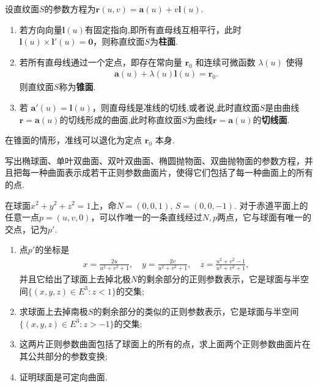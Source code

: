 \documentclass[../../main.tex]{subfiles}%
\begin{document}
\begin{definition}
设直纹面$S$的参数方程为$\bm{r}(u,v)=\bm{a}(u)+v\bm{l}(u)$.
\begin{enumerate}[(1)]
\item 若方向向量$\bm{l}(u)$有固定指向,即所有直母线互相平行，此时$\bm{l}(u)\times\bm{l}'(u)=\bm{0}$，则称直纹面$S$为\textbf{柱面}.

\item 若所有直母线通过一个定点，即存在常向量 $\bm{r}_0$ 和连续可微函数 $\lambda(u)$ 使得
\begin{align*}
\bm{a}(u)+\lambda(u)\bm{l}(u)=\bm{r}_0.
\end{align*}
则直纹面$S$称为\textbf{锥面}.

\item 若 $\bm{a}'(u)=\bm{l}(u)$，则直母线是准线的切线,或者说,此时直纹面$S$是由曲线$\bm{r}=\bm{a}(u)$的切线形成的曲面,此时称直纹面$S$为曲线$\bm{r}=\bm{a}(u)$的\textbf{切线面}.
\end{enumerate}
\end{definition}
\begin{remark}
在锥面的情形，准线可以退化为定点 $\bm{r}_0$ 本身.
\end{remark}

\begin{example}
写出椭球面、单叶双曲面、双叶双曲面、椭圆抛物面、双曲抛物面的参数方程，并且把每一种曲面表示成若干正则参数曲面片，使得它们包括了每一种曲面上的所有的点.
\end{example}
\begin{solution}



\end{solution}

\begin{example}
在球面$x^2 + y^2 + z^2 = 1$上，命$N = (0,0,1)$, $S = (0,0,-1)$. 对于赤道平面上的任意一点$p = (u,v,0)$，可以作唯一的一条直线经过$N, p$两点，它与球面有唯一的交点，记为$p'$.
\begin{enumerate}[(1)]
\item 点$p'$的坐标是
\begin{align*}
x = \frac{2u}{u^2 + v^2 + 1}, \quad y = \frac{2v}{u^2 + v^2 + 1}, \quad z = \frac{u^2 + v^2 - 1}{u^2 + v^2 + 1},
\end{align*}
并且它给出了球面上去掉北极$N$的剩余部分的正则参数表示，它是球面与半空间$\{(x,y,z) \in E^3: z < 1\}$的交集;
\item 求球面上去掉南极$S$的剩余部分的类似的正则参数表示，它是球面与半空间$\{(x,y,z) \in E^3: z > -1\}$的交集;
\item 这两片正则参数曲面包括了球面上的所有的点，求上面两个正则参数曲面片在其公共部分的参数变换;
\item 证明球面是可定向曲面.
\end{enumerate}
\end{example}
\begin{solution}



\end{solution}
\end{document}
